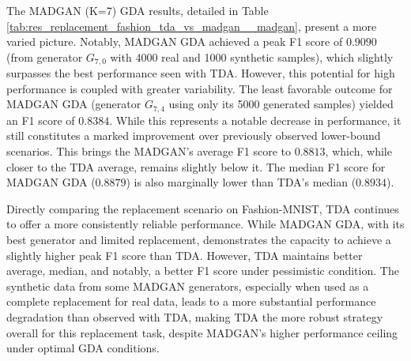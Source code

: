 The MADGAN (K=7) GDA results, detailed in Table \ref{tab:res_replacement_fashion_tda_vs_madgan__madgan}, present a more varied picture. Notably, MADGAN GDA achieved a peak F1 score of $0.9090$ (from generator \(G_{7,0}\) with 4000 real and 1000 synthetic samples), which slightly surpasses the best performance seen with TDA. However, this potential for high performance is coupled with greater variability. The least favorable outcome for MADGAN GDA (generator \(G_{7,4}\) using only its 5000 generated samples) yielded an F1 score of \(0.8384\). While this represents a notable decrease in performance, it still constitutes a marked improvement over previously observed lower-bound scenarios. This brings the MADGAN’s average F1 score to \(0.8813\), which, while closer to the TDA average, remains slightly below it. The median F1 score for MADGAN GDA (\(0.8879\)) is also marginally lower than TDA’s median (\(0.8934\)).

Directly comparing the replacement scenario on Fashion-MNIST, TDA continues to offer a more consistently reliable performance. While MADGAN GDA, with its best generator and limited replacement, demonstrates the capacity to achieve a slightly higher peak F1 score than TDA. However, TDA maintains better average, median, and notably, a better F1 score under pessimistic condition. The synthetic data from some MADGAN generators, especially when used as a complete replacement for real data, leads to a more substantial performance degradation than observed with TDA, making TDA the more robust strategy overall for this replacement task, despite MADGAN's higher performance ceiling under optimal GDA conditions.

